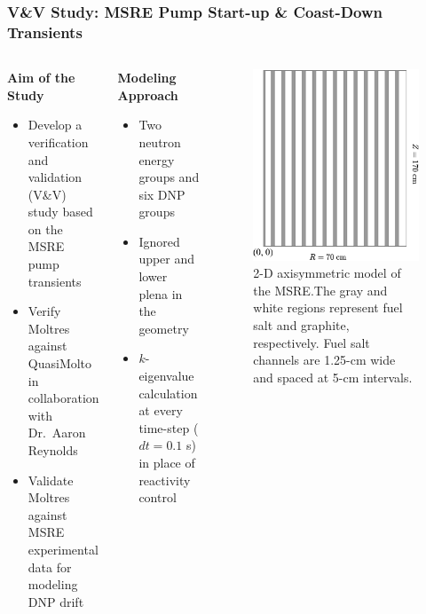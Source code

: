 \begin{frame}
  \frametitle{V\&V Study: MSRE Pump Start-up \& Coast-Down Transients}
  \begin{columns}
    \column{6.5cm}
    \begin{block}{\textbf{Aim of the Study}}
      \begin{itemize}
         \item Develop a verification and validation (V\&V) study based on the MSRE pump transients
         \item Verify Moltres against QuasiMolto \cite{reynolds_analysis_2023} in collaboration
           with Dr.\ Aaron Reynolds
         \item Validate Moltres against MSRE experimental data for modeling \gls{DNP} drift
       \end{itemize}
    \end{block}
    \begin{block}{\textbf{Modeling Approach}}
      \begin{itemize}
        \item Two neutron energy groups and six DNP groups
        \item Ignored upper and lower plena in the geometry
        \item $k$-eigenvalue calculation at every time-step ($dt=0.1$ s) in place of reactivity control
      \end{itemize}
    \end{block}
    \column{4.5cm}
    \begin{figure}[htb]
      \centering
      \includegraphics[width=0.8\columnwidth]{images/msre-2d-pres}
      \caption{2-D axisymmetric model of the \gls{MSRE}.The gray and white regions represent fuel salt
      and graphite, respectively. Fuel salt channels are 1.25-cm wide and spaced at 5-cm intervals.}
      \label{fig:pump-geom}
    \end{figure}
  \end{columns}
\end{frame}

